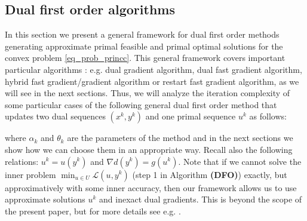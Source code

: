 \documentclass{gOMS2e}
\theoremstyle{plain}
\theoremstyle{definition}
\theoremstyle{remark}
\begin{document}
\subsection{Dual first order algorithms}
\noindent In this section we present  a general framework for  dual first order
methods generating approximate primal feasible and primal optimal
solutions for the convex problem \eqref{eq_prob_princc}. This
general framework covers important particular algorithms \cite{Nes:04,BecTeb:14}:
e.g. dual gradient algorithm,  dual fast gradient algorithm,
hybrid fast gradient/gradient algorithm or restart fast gradient algorithm,
as we will see in the next sections. Thus, we will analyze the iteration complexity of some particular cases   of  the following general dual first order method that updates two dual sequences $(x^k, y^k)$ and one primal sequence $u^k$ as follows:
\begin{center}
\end{center}
where $\alpha_k$ and $\theta_k$ are the parameters  of the method
and in the next sections we show how we can choose them in an
appropriate way. Recall also the following relations: $u^k = u(y^k)$
and ${\nabla} d(y^k)= g({}{u}^k)$. Note that if we cannot solve the inner problem $\min_{u \in U} \mathcal{L}(u,y^k)$ (step 1 in Algorithm \textbf{(DFO)}) exactly, but approximatively with some inner accuracy, then our framework allows us to use
approximate solutions $u^k$ and inexact dual gradients. This is
beyond the scope of the present paper, but for more details see e.g.
\cite{NecNed:13,NedNec:12,WanLin:13}.
\end{document}
